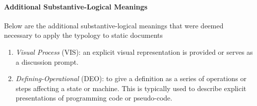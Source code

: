 \documentclass[conference]{IEEEtran}
\begin{document}
\paragraph{Additional Substantive-Logical Meanings}
Below are the additional substantive-logical meanings that were deemed necessary
to apply the typology to static documents
\begin{enumerate}
  \item \emph{Visual Process} (VIS): an explicit visual representation is
    provided or serves as a discussion prompt.
  \item \emph{Defining-Operational} (DEO): to give a definition as a series
    of operations or steps affecting a state or machine. This is typically
    used to
    describe explicit presentations of programming code or pseudo-code.
\end{enumerate}
\end{document}
